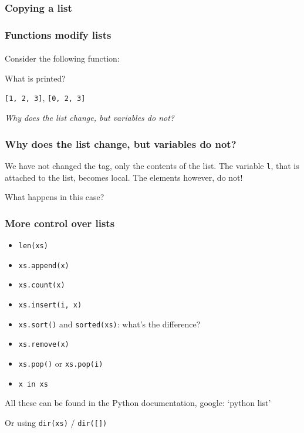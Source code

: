 \begin{frame}\frametitle{Copying a list}


\end{frame}

\begin{frame}\frametitle{Functions modify lists}
    \framesubtitle{}

    Consider the following function:


    What is printed?

    \vfill \pause

    \texttt{[1, 2, 3]}, \texttt{[0, 2, 3]}

    \emph{Why does the list change, but variables do not?}

\end{frame}

\begin{frame}\frametitle{Why does the list change, but variables do not?}
    We have not changed the tag, only the contents of the list.
    The variable \texttt{l}, that is attached to the list, becomes local.
    The elements however, do not!

    \pause

    What happens in this case?
\end{frame}

\begin{frame}\frametitle{More control over lists}

    \begin{itemize}
        \item \texttt{len(xs)}
        \item \texttt{xs.append(x)}
        \item \texttt{xs.count(x)}
        \item \texttt{xs.insert(i, x)}
        \item \texttt{xs.sort()} and \texttt{sorted(xs)}: what's the difference?
        \item \texttt{xs.remove(x)}
        \item \texttt{xs.pop()} or \texttt{xs.pop(i)}
        \item \texttt{x in xs}
    \end{itemize}

    \pause
    All these can be found in the Python documentation, google: `python list'

    Or using \texttt{dir(xs)} / \texttt{dir([])}

\end{frame}

